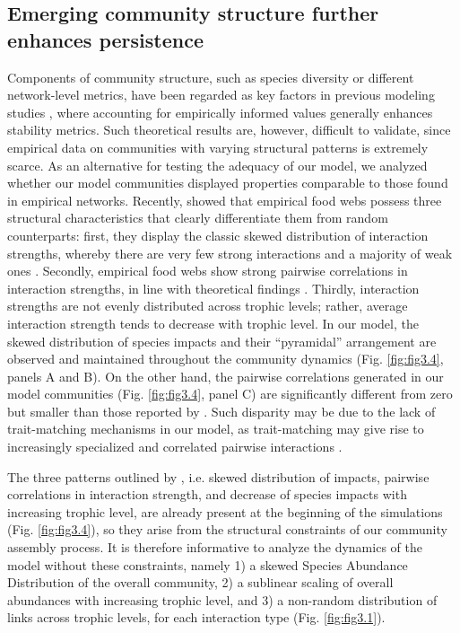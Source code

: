 \subsection*{Emerging community structure further enhances persistence}

Components of community structure, such as species diversity or different network-level metrics, have been regarded as key factors in previous modeling studies \citep{Sauve2014,Sauve2016}, where accounting for empirically informed values generally enhances stability metrics. Such theoretical results are, however, difficult to validate, since empirical data on communities with varying structural patterns is extremely scarce. As an alternative for testing the adequacy of our model, we analyzed whether our model communities displayed properties comparable to those found in empirical networks. Recently, \cite{Jacquet2016} showed that empirical food webs possess three structural characteristics that clearly differentiate them from random counterparts: first, they display the classic skewed distribution of interaction strengths, whereby there are very few strong interactions and a majority of weak ones \citep{McCann1998}. Secondly, empirical food webs show strong pairwise correlations in interaction strengths, in line with theoretical findings \citep{Tang2014}. Thirdly, interaction strengths are not evenly distributed across trophic levels; rather, average interaction strength tends to decrease with trophic level. In our model, the skewed distribution of species impacts and their “pyramidal” arrangement are observed and maintained throughout the community dynamics (Fig. \ref{fig:fig3.4}, panels A and B). On the other hand, the pairwise correlations generated in our model communities (Fig. \ref{fig:fig3.4}, panel C) are significantly different from zero but smaller than those reported by \cite{Tang2014}. Such disparity may be due to the lack of trait-matching mechanisms in our model, as trait-matching may give rise to increasingly specialized and correlated pairwise interactions \citep{Santamaria2007}.

The three patterns outlined by \cite{Jacquet2016}, i.e. skewed distribution of impacts, pairwise correlations in interaction strength, and decrease of species impacts with increasing trophic level, are already present at the beginning of the simulations (Fig. \ref{fig:fig3.4}), so they arise from the structural constraints of our community assembly process. It is therefore informative to analyze the dynamics of the model without these constraints, namely 1) a skewed Species Abundance Distribution of the overall community, 2) a sublinear scaling of overall abundances with increasing trophic level, and 3) a non-random distribution of links across trophic levels, for each interaction type (Fig. \ref{fig:fig3.1}).

